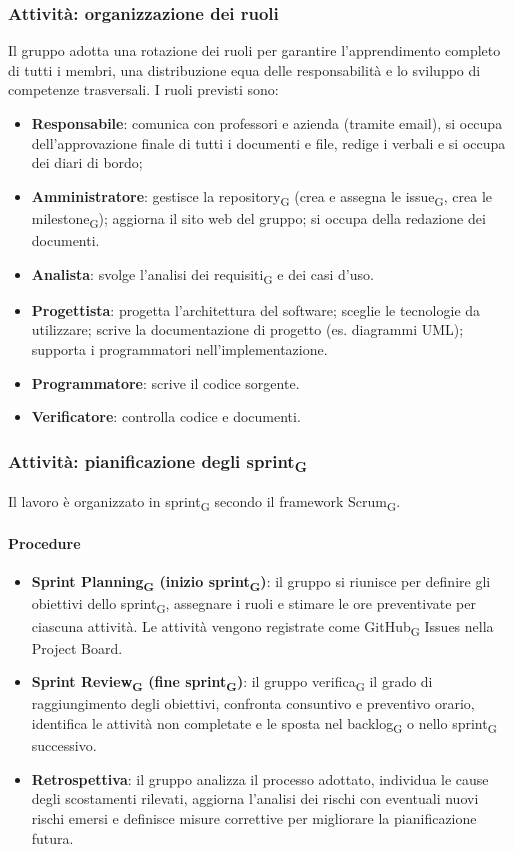 \documentclass[11pt,a4paper]{article}
\newcommand{\gls}[1]{#1\textsubscript{G}}
\begin{document}
\subsubsection{Attività: organizzazione dei ruoli}
Il gruppo adotta una rotazione dei ruoli per garantire l'apprendimento completo di tutti i membri, una distribuzione equa delle responsabilità e lo sviluppo di competenze trasversali. I ruoli previsti sono:
\begin{itemize}
    \item \textbf{Responsabile}: comunica con professori e azienda (tramite email), si occupa dell'approvazione finale di tutti i documenti e file, redige i verbali e si occupa dei diari di bordo;
    \item \textbf{Amministratore}: gestisce la \gls{repository} (crea e assegna le \gls{issue}, crea le \gls{milestone}); aggiorna il sito web del gruppo; si occupa della redazione dei documenti.
    \item \textbf{Analista}: svolge l'\gls{analisi dei requisiti} e dei casi d'uso.
    \item \textbf{Progettista}: progetta l'architettura del software; sceglie le tecnologie da utilizzare; scrive la documentazione di progetto (es. diagrammi UML); supporta i programmatori nell'implementazione.
    \item \textbf{Programmatore}: scrive il codice sorgente.
    \item \textbf{Verificatore}: controlla codice e documenti.
\end{itemize}

\subsubsection{Attività: pianificazione degli \gls{sprint}}
Il lavoro è organizzato in \gls{sprint} secondo il framework \gls{Scrum}.

\paragraph{Procedure}
\begin{itemize}
    \item \textbf{\gls{Sprint Planning} (inizio \gls{sprint})}: il gruppo si riunisce per definire gli obiettivi dello \gls{sprint}, assegnare i ruoli e stimare le ore preventivate per ciascuna attività. Le attività vengono registrate come \gls{GitHub} Issues nella Project Board.
    \item \textbf{\gls{Sprint Review} (fine \gls{sprint})}: il gruppo \gls{verifica} il grado di raggiungimento degli obiettivi, confronta consuntivo e preventivo orario, identifica le attività non completate e le sposta nel \gls{backlog} o nello \gls{sprint} successivo.
    \item \textbf{Retrospettiva}: il gruppo analizza il processo adottato,
    individua le cause degli scostamenti rilevati, aggiorna l'analisi dei
    rischi con eventuali nuovi rischi emersi e definisce misure correttive
    per migliorare la pianificazione futura.
\end{itemize}
\end{document}
